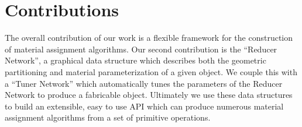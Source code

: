 \documentclass[annual]{acmsiggraph}
\begin{document}
\section{Contributions}
The overall contribution of our work is a flexible framework for the construction of material assignment algorithms. Our second contribution is the ``Reducer Network'',  a graphical data structure which describes both the geometric partitioning and material parameterization of  a given object. We couple this with a ``Tuner Network'' which automatically tunes the parameters of the Reducer Network to produce a fabricable object. Ultimately  we use these data structures to build an extensible, easy to use API which can produce numerous material assignment algorithms from a set of primitive operations.
\end{document}
